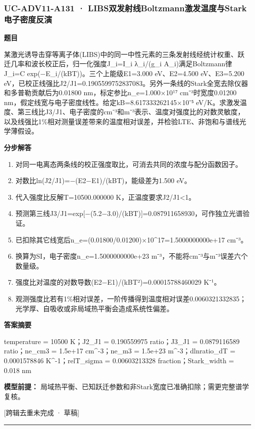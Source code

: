 \documentclass[UTF8,11pt,a4paper]{ctexart}
\begin{document}
\subsubsection*{UC-ADV11-A131 · LIBS双发射线Boltzmann激发温度与Stark电子密度反演}
\noindent\textbf{题目}\par
某激光诱导击穿等离子体(LIBS)中的同一中性元素的三条发射线经统计权重、跃迁几率和波长校正后，归一化强度J\_i=I\_i λ\_i/(g\_i A\_i)满足Boltzmann律J\_i=C exp(−E\_i/(kBT))。三个上能级E1=3.000 eV、E2=4.500 eV、E3=5.200 eV，已校正线强比J2/J1=0.1905599752837083。另外一条线的Stark全宽去除仪器和多普勒贡献后为0.01800 nm，标定参比n\_e=1.000×10¹⁷ cm⁻³时宽度0.01200 nm，假定线宽与电子密度线性。给定kB=8.617333262145×10⁻⁵ eV/K。求激发温度、第三线比J3/J1、电子密度的cm⁻³和m⁻³表示、温度对强度比的对数灵敏度，以及线强比1\%相对测量误差带来的温度相对误差，并检验LTE、非饱和与谱线光学薄假设。\par
\medskip\noindent\textbf{分步解答}
\begin{enumerate}
\item 对同一电离态两条线的校正强度取比，可消去共同的浓度与配分函数因子。
\item 对数比ln(J2/J1)=−(E2−E1)/(kBT)，能级差为1.500 eV。
\item 代入强度比反解T=10500.000000 K，正温度要求J2/J1<1。
\item 预测第三线J3/J1=exp[−(5.2−3.0)/(kBT)]=0.087911658930，可作独立光谱验证。
\item 已扣除其它线宽后n\_e=(0.01800/0.01200)×10\textasciicircum{}17=1.5000000000e+17 cm⁻³。
\item 换算为SI，电子密度n\_e=1.5000000000e+23 m⁻³，不能将cm⁻³与m⁻³误差六个数量级。
\item 强度比对温度的对数导数(E2−E1)/(kBT²)=0.00015788460029 K⁻¹。
\item 观测强度比若有1\%相对误差，一阶传播得到温度相对误差0.0060321332835；光学厚、自吸收或非局域热平衡会造成系统性偏差。
\end{enumerate}
\noindent\textbf{答案摘要}\par
temperature = 10500 K；J2\_J1 = 0.190559975 ratio；J3\_J1 = 0.0879116589 ratio；ne\_cm3 = 1.5e+17 cm\textasciicircum{}-3；ne\_m3 = 1.5e+23 m\textasciicircum{}-3；dlnratio\_dT = 0.0001578846 K\textasciicircum{}-1；relT\_sigma = 0.00603213328 fraction；Stark\_width = 0.018 nm\par
\noindent\textbf{模型前提：}
局域热平衡、已知跃迁参数和非Stark宽度已准确扣除；需更完整谱学复核。\par
\noindent\textcolor{red!65!black}{[跨辑去重未完成 · 草稿]} \par
\medskip\hrule\medskip
{}
\end{document}
